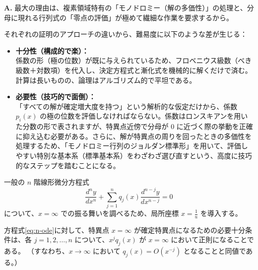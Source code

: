 \begin{Q}
\textbf{A.} 最大の理由は、複素領域特有の「モノドロミー（解の多価性）」の処理と、分母に現れる行列式の「零点の評価」が極めて繊細な作業を要求するから。

それぞれの証明のアプローチの違いから、難易度に以下のような差が生じる：
\begin{itemize}
    \item \textbf{十分性（構成的で楽）：}\\
    係数の形（極の位数）が既に与えられているため、フロベニウス級数（べき級数＋対数項）を代入し、決定方程式と漸化式を機械的に解くだけで済む。計算は長いものの、論理はアルゴリズム的で平坦である。
    
    \item \textbf{必要性（技巧的で面倒）：}\\
    「すべての解が確定増大度を持つ」という解析的な仮定だけから、係数 $p_i(x)$ の極の位数を評価しなければならない。係数はロンスキアンを用いた分数の形で表されますが、特異点近傍で分母が $0$ に近づく際の挙動を正確に抑え込む必要がある。さらに、解が特異点の周りを回ったときの多価性を処理するため、「モノドロミー行列のジョルダン標準形」を用いて、評価しやすい特別な基本系（標準基本系）をわざわざ選び直すという、高度に技巧的なステップを踏むことになる。
\end{itemize}
\end{Q}

一般の $n$ 階線形微分方程式
\begin{equation}\label{eq:n-ode}
\frac{d^{n}y}{dx^{n}} + \sum_{j=1}^{n} q_{j}(x)\frac{d^{n-j}y}{dx^{n-j}} = 0
\end{equation}
について、$x=\infty$ での振る舞いを調べるため、局所座標 $x = \frac{1}{u}$ を導入する。

\begin{proposition}\label{prop:regular_infinity_n}
方程式\eqref{eq:n-ode}に対して、特異点 $x=\infty$ が確定特異点になるための必要十分条件は、各 $j = 1, 2, \dots, n$ について、$x^{j}q_{j}(x)$ が $x=\infty$ において正則になることである。
（すなわち、$x \to \infty$ において $q_{j}(x) = O(x^{-j})$ となることと同値である。）
\end{proposition}


